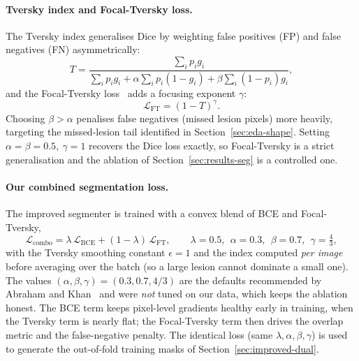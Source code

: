 \documentclass[11pt]{article}
\begin{document}
\paragraph{Tversky index and Focal-Tversky loss.}
The Tversky index generalises Dice by weighting false positives (FP) and false
negatives (FN) asymmetrically:
\begin{equation}
T = \frac{\sum_i p_i g_i}{\sum_i p_i g_i + \alpha\sum_i p_i(1-g_i) + \beta\sum_i (1-p_i)g_i},
\end{equation}
and the Focal-Tversky loss~\cite{salehi2017tversky,abraham2019focaltversky} adds a
focusing exponent $\gamma$:
\begin{equation}
\mathcal{L}_{\mathrm{FT}} = (1-T)^{\gamma}.
\end{equation}
Choosing $\beta>\alpha$ penalises false negatives (missed lesion pixels) more
heavily, targeting the missed-lesion tail identified in
Section~\ref{sec:eda-shape}. Setting $\alpha=\beta=0.5,\ \gamma=1$ recovers the
Dice loss exactly, so Focal-Tversky is a strict generalisation and the ablation of
Section~\ref{sec:results-seg} is a controlled one.

\paragraph{Our combined segmentation loss.}
The improved segmenter is trained with a convex blend of BCE and Focal-Tversky,
\begin{equation}
\mathcal{L}_{\mathrm{combo}} = \lambda\,\mathcal{L}_{\mathrm{BCE}} +
(1-\lambda)\,\mathcal{L}_{\mathrm{FT}},
\qquad
\lambda = 0.5,\ \ \alpha = 0.3,\ \ \beta = 0.7,\ \ \gamma = \tfrac{4}{3},
\label{eq:combo}
\end{equation}
with the Tversky smoothing constant $\epsilon = 1$ and the index computed
\emph{per image} before averaging over the batch (so a large lesion cannot dominate
a small one). The values $(\alpha,\beta,\gamma)=(0.3,0.7,4/3)$ are the defaults
recommended by Abraham and Khan~\cite{abraham2019focaltversky} and were
\emph{not} tuned on our data, which keeps the ablation honest. The BCE term keeps
pixel-level gradients healthy early in training, when the Tversky term is nearly
flat; the Focal-Tversky term then drives the overlap metric and the false-negative
penalty. The identical loss (same $\lambda,\alpha,\beta,\gamma$) is used to
generate the out-of-fold training masks of Section~\ref{sec:improved-dual}.
\end{document}
